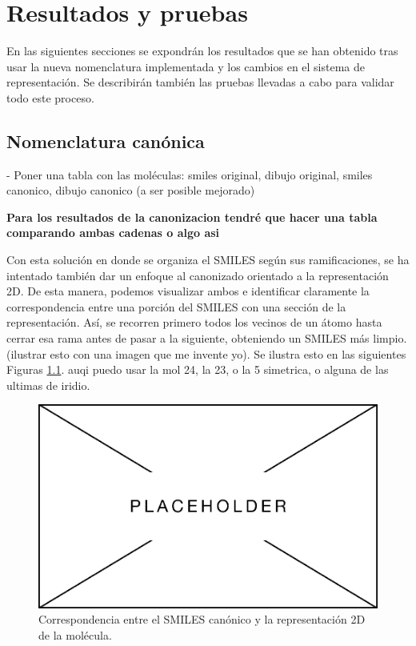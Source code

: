 
\chapter{Resultados y pruebas}

En las siguientes secciones se expondrán los resultados que se han obtenido tras usar la nueva nomenclatura implementada y los cambios en el sistema de representación. Se describirán también las pruebas llevadas a cabo para validar todo este proceso.

\section{Nomenclatura canónica}
- Poner una tabla con las moléculas: smiles original, dibujo original, smiles canonico, dibujo canonico (a ser posible mejorado)

\textbf{Para los resultados de la canonizacion tendré que hacer una tabla comparando ambas cadenas o algo asi}

Con esta solución en donde se organiza el SMILES según sus ramificaciones, se ha intentado también dar un enfoque al canonizado orientado a la representación 2D. De esta manera, podemos visualizar ambos e identificar claramente la correspondencia entre una porción del SMILES con una sección de la representación. Así, se recorren primero todos los vecinos de un átomo hasta cerrar esa rama antes de pasar a la siguiente, obteniendo un SMILES más limpio. (ilustrar esto con una imagen que me invente yo). Se ilustra esto en las siguientes Figuras \ref{fig:smiles_vs_dibujo}.
auqi puedo usar la mol 24, la 23, o la 5 simetrica, o alguna de las ultimas de iridio.

\begin{figure}[h!]
    \centering
    \includegraphics[scale=0.5]{imagenes/placeholder.png}
    \caption{Correspondencia entre el SMILES canónico y la representación 2D de la molécula.}
    \label{fig:smiles_vs_dibujo}
\end{figure}

